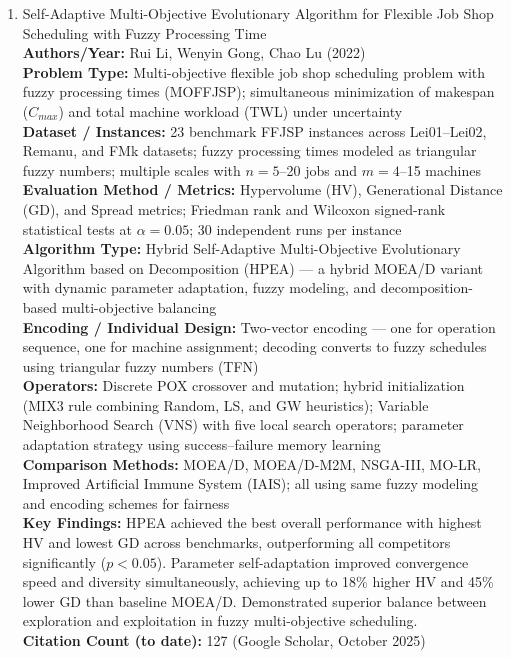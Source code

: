 \documentclass[a4paper,12pt]{article}
\begin{document}
\begin{enumerate}[leftmargin=2em, labelwidth=1em, labelsep=0.5em, itemsep=1ex]
  \item Self-Adaptive Multi-Objective Evolutionary Algorithm for Flexible Job Shop Scheduling with Fuzzy Processing Time \\
    \textbf{Authors/Year:} Rui Li, Wenyin Gong, Chao Lu (2022) \\  
    \textbf{Problem Type:} Multi-objective flexible job shop scheduling problem with fuzzy processing times (MOFFJSP); simultaneous minimization of makespan ($C_{max}$) and total machine workload (TWL) under uncertainty \\  
    \textbf{Dataset / Instances:} 23 benchmark FFJSP instances across Lei01–Lei02, Remanu, and FMk datasets; fuzzy processing times modeled as triangular fuzzy numbers; multiple scales with $n=5$–20 jobs and $m=4$–15 machines \\  
    \textbf{Evaluation Method / Metrics:} Hypervolume (HV), Generational Distance (GD), and Spread metrics; Friedman rank and Wilcoxon signed-rank statistical tests at $\alpha = 0.05$; 30 independent runs per instance \\  
    \textbf{Algorithm Type:} Hybrid Self-Adaptive Multi-Objective Evolutionary Algorithm based on Decomposition (HPEA) — a hybrid MOEA/D variant with dynamic parameter adaptation, fuzzy modeling, and decomposition-based multi-objective balancing \\  
    \textbf{Encoding / Individual Design:} Two-vector encoding — one for operation sequence, one for machine assignment; decoding converts to fuzzy schedules using triangular fuzzy numbers (TFN) \\  
    \textbf{Operators:} Discrete POX crossover and mutation; hybrid initialization (MIX3 rule combining Random, LS, and GW heuristics); Variable Neighborhood Search (VNS) with five local search operators; parameter adaptation strategy using success–failure memory learning \\  
    \textbf{Comparison Methods:} MOEA/D, MOEA/D-M2M, NSGA-III, MO-LR, Improved Artificial Immune System (IAIS); all using same fuzzy modeling and encoding schemes for fairness \\  
    \textbf{Key Findings:} HPEA achieved the best overall performance with highest HV and lowest GD across benchmarks, outperforming all competitors significantly ($p<0.05$). Parameter self-adaptation improved convergence speed and diversity simultaneously, achieving up to 18\% higher HV and 45\% lower GD than baseline MOEA/D. Demonstrated superior balance between exploration and exploitation in fuzzy multi-objective scheduling. \\  
    \textbf{Citation Count (to date):} 127 (Google Scholar, October 2025) \\[2ex]
  

\end{enumerate}
\end{document}
